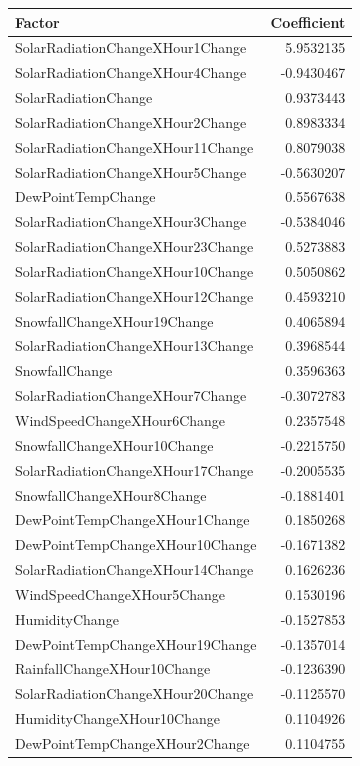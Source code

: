 \documentclass[
  letterpaper,
  DIV=11,
  numbers=noendperiod]{scrartcl}
\begin{document}
\begin{longtable}[]{@{}lr@{}}
\toprule\noalign{}
Factor & Coefficient \\
\midrule\noalign{}
\endhead
\bottomrule\noalign{}
\endlastfoot
SolarRadiationChangeXHour1Change & 5.9532135 \\
SolarRadiationChangeXHour4Change & -0.9430467 \\
SolarRadiationChange & 0.9373443 \\
SolarRadiationChangeXHour2Change & 0.8983334 \\
SolarRadiationChangeXHour11Change & 0.8079038 \\
SolarRadiationChangeXHour5Change & -0.5630207 \\
DewPointTempChange & 0.5567638 \\
SolarRadiationChangeXHour3Change & -0.5384046 \\
SolarRadiationChangeXHour23Change & 0.5273883 \\
SolarRadiationChangeXHour10Change & 0.5050862 \\
SolarRadiationChangeXHour12Change & 0.4593210 \\
SnowfallChangeXHour19Change & 0.4065894 \\
SolarRadiationChangeXHour13Change & 0.3968544 \\
SnowfallChange & 0.3596363 \\
SolarRadiationChangeXHour7Change & -0.3072783 \\
WindSpeedChangeXHour6Change & 0.2357548 \\
SnowfallChangeXHour10Change & -0.2215750 \\
SolarRadiationChangeXHour17Change & -0.2005535 \\
SnowfallChangeXHour8Change & -0.1881401 \\
DewPointTempChangeXHour1Change & 0.1850268 \\
DewPointTempChangeXHour10Change & -0.1671382 \\
SolarRadiationChangeXHour14Change & 0.1626236 \\
WindSpeedChangeXHour5Change & 0.1530196 \\
HumidityChange & -0.1527853 \\
DewPointTempChangeXHour19Change & -0.1357014 \\
RainfallChangeXHour10Change & -0.1236390 \\
SolarRadiationChangeXHour20Change & -0.1125570 \\
HumidityChangeXHour10Change & 0.1104926 \\
DewPointTempChangeXHour2Change & 0.1104755 \\

\end{longtable}
\end{document}
